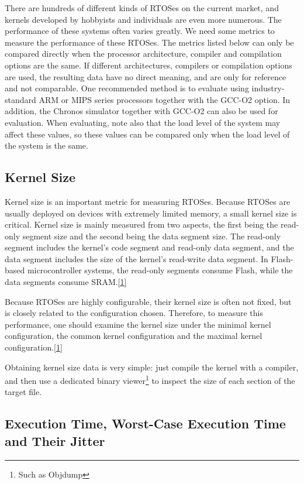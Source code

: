 There are hundreds of different kinds of RTOSes on the current market, and kernels developed by hobbyists and individuals are even more numerous. The performance of these systems often varies greatly. We need some metrics to measure the performance of these RTOSes. The metrics listed below can only be compared directly when the processor architecture, compiler and compilation options are the same. If different architectures, compilers or compilation options are used, the resulting data have no direct meaning, and are only for reference and not comparable. One recommended method is to evaluate using industry-standard ARM or MIPS series processors together with the GCC-O2 option. In addition, the Chronos simulator together with GCC-O2 can also be used for evaluation. When evaluating, note also that the load level of the system may affect these values, so these values can be compared only when the load level of the system is the same.

\subsection{Kernel Size}\label{subsec:1-kernel-size}

Kernel size is an important metric for measuring RTOSes. Because RTOSes are usually deployed on devices with extremely limited memory, a small kernel size is critical. Kernel size is mainly measured from two aspects, the first being the read-only segment size and the second being the data segment size. The read-only segment includes the kernel's code segment and read-only data segment, and the data segment includes the size of the kernel's read-write data segment. In Flash-based microcontroller systems, the read-only segments consume Flash, while the data segments consume SRAM.\hyperref[cite:1-1]{{[}1{]}}

Because RTOSes are highly configurable, their kernel size is often not fixed, but is closely related to the configuration chosen. Therefore, to measure this performance, one should examine the kernel size under the minimal kernel configuration, the common kernel configuration and the maximal kernel configuration.\hyperref[cite:1-1]{{[}1{]}}

Obtaining kernel size data is very simple: just compile the kernel with a compiler, and then use a dedicated binary viewer\footnote{Such as Objdump} to inspect the size of each section of the target file.

\subsection{Execution Time, Worst-Case Execution Time and Their Jitter}\label{subsec:1-execution-time-and-jitter}

